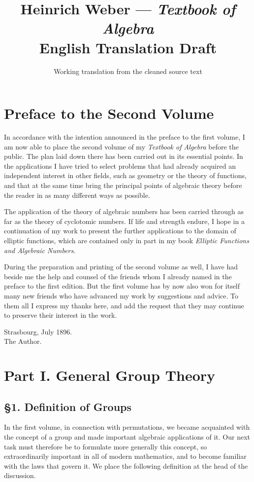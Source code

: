 \documentclass[12pt,a4paper]{book}
\title{Heinrich Weber --- \textit{Textbook of Algebra}\\English Translation Draft}
\author{Working translation from the cleaned source text}
\date{}
\begin{document}
\maketitle
\chapter*{Preface to the Second Volume}
In accordance with the intention announced in the preface to the first volume, I am now able to place the second volume of my \emph{Textbook of Algebra} before the public. The plan laid down there has been carried out in its essential points. In the applications I have tried to select problems that had already acquired an independent interest in other fields, such as geometry or the theory of functions, and that at the same time bring the principal points of algebraic theory before the reader in as many different ways as possible.

The application of the theory of algebraic numbers has been carried through as far as the theory of cyclotomic numbers. If life and strength endure, I hope in a continuation of my work to present the further applications to the domain of elliptic functions, which are contained only in part in my book \emph{Elliptic Functions and Algebraic Numbers}.

During the preparation and printing of the second volume as well, I have had beside me the help and counsel of the friends whom I already named in the preface to the first edition. But the first volume has by now also won for itself many new friends who have advanced my work by suggestions and advice. To them all I express my thanks here, and add the request that they may continue to preserve their interest in the work.

\begin{flushright}
Strasbourg, July 1896.\\
The Author.
\end{flushright}

\chapter*{Part I. General Group Theory}
\section*{\S 1. Definition of Groups}
In the first volume, in connection with permutations, we became acquainted with the concept of a group and made important algebraic applications of it. Our next task must therefore be to formulate more generally this concept, so extraordinarily important in all of modern mathematics, and to become familiar with the laws that govern it. We place the following definition at the head of the discussion.
\end{document}
